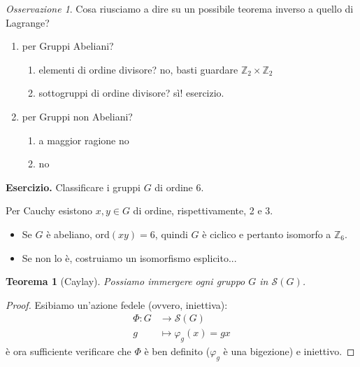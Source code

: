 \documentclass[a4paper]{article}
\newtheorem{theorem}{Teorema}[section]
\theoremstyle{remark}
\newtheorem*{remark}{Osservazione}
\theoremstyle{definition}
\newcommand{\fun}[5]{\begin{align*}
	#1 \colon #2 &\to #3 \\
	#4 &\mapsto #5
	\end{align*}}
\begin{document}
\begin{multicols}{2}
\begin{remark}
	Cosa riusciamo a dire su un possibile teorema inverso a quello di Lagrange?
\end{remark}
\begin{enumerate}
	\item per Gruppi Abeliani?
	\begin{enumerate}
		\item elementi di ordine divisore? no, basti guardare $ \mathbb{Z}_2 \times \mathbb{Z}_2 $
		\item sottogruppi di ordine divisore? sì! esercizio.
	\end{enumerate}
	\item per Gruppi non Abeliani?
	\begin{enumerate}
		\item a maggior ragione no
		\item no
	\end{enumerate}
\end{enumerate}

\textbf{Esercizio.} Classificare i gruppi $ G $ di ordine $ 6 $.

Per Cauchy esistono $ x, y \in G $ di ordine, rispettivamente, 2 e 3.
\begin{itemize}
	\item Se $ G $ è abeliano, ord$ (xy) = 6 $, quindi $ G $ è ciclico e pertanto isomorfo a $ \mathbb{Z}_6 $.
	\item Se non lo è, costruiamo un isomorfismo esplicito...
\end{itemize}

\begin{theorem}[Caylay]
	Possiamo immergere ogni gruppo $ G $ in $ \mathcal{S}(G) $.
\end{theorem}
\begin{proof}
	Esibiamo un'azione fedele (ovvero, iniettiva): \fun{\Phi}{G}{\mathcal{S}(G)}{g}{\varphi_g(x) = gx}
	è ora sufficiente verificare che $ \Phi $ è ben definito ($ \varphi_g $ è una bigezione) e iniettivo.
\end{proof}


\end{multicols}
\end{document}
